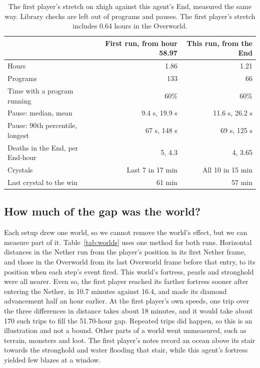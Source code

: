 \documentclass[11pt,a4paper]{article}
\begin{document}
\begin{table}[t]
  \caption{The first player's stretch on xhigh against this agent's End, measured the same way. Library checks are left out of programs and pauses. The first player's stretch includes 0.64 hours in the Overworld.}
  \label{tab:effort}
  \small
  \begin{tabularx}{\textwidth}{@{}Xrr@{}}
    \toprule
    & \textbf{First run, from hour 58.97} & \textbf{This run, from the End} \\
    \midrule
    Hours & 1.86 & 1.21 \\
    Programs & 133 & 66 \\
    Time with a program running & 60\% & 60\% \\
    Pause: median, mean & 9.4 s, 19.9 s & 11.6 s, 26.2 s \\
    Pause: 90th percentile, longest & 67 s, 148 s & 69 s, 125 s \\
    Deaths in the End, per End-hour & 5, 4.3 & 4, 3.65 \\
    Crystals & Last 7 in 17 min & All 10 in 15 min \\
    Last crystal to the win & 61 min & 57 min \\
    \bottomrule
  \end{tabularx}
\end{table}

\subsection{How much of the gap was the world?}
\label{sec:worlds}

Each setup drew one world, so we cannot remove the world's effect, but we can measure part of it. Table~\ref{tab:worlds} uses one method for both runs. Horizontal distances in the Nether run from the player's position in its first Nether frame, and those in the Overworld from its last Overworld frame before that entry, to its position when each step's event fired. This world's fortress, pearls and stronghold were all nearer. Even so, the first player reached its farther fortress sooner after entering the Nether, in 10.7 minutes against 16.4, and made its diamond advancement half an hour earlier. At the first player's own speeds, one trip over the three differences in distance takes about 18 minutes, and it would take about 170 such trips to fill the 51.70-hour gap. Repeated trips did happen, so this is an illustration and not a bound. Other parts of a world went unmeasured, such as terrain, monsters and loot. The first player's notes record an ocean above its stair towards the stronghold and water flooding that stair, while this agent's fortress yielded few blazes at a window.
\end{document}
